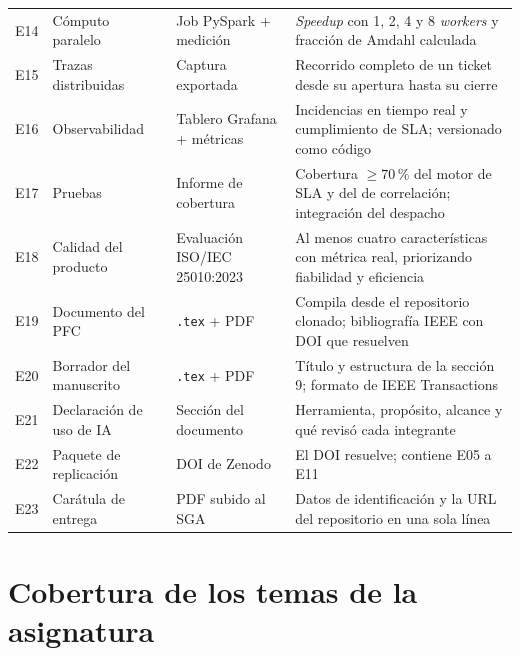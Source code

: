 \documentclass[11pt,a4paper]{article}
\begin{document}
\begin{center}
\begin{longtable}{@{}p{0.9cm}p{4.6cm}p{4.2cm}p{5.0cm}@{}}
		E14 & Cómputo paralelo & Job PySpark + medición & \emph{Speedup} con 1, 2, 4 y 8 \emph{workers} y fracción de Amdahl calculada \\
		E15 & Trazas distribuidas & Captura exportada & Recorrido completo de un ticket desde su apertura hasta su cierre \\
		E16 & Observabilidad & Tablero Grafana + métricas & Incidencias en tiempo real y cumplimiento de SLA; versionado como código \\
		E17 & Pruebas & Informe de cobertura & Cobertura $\geq 70\,\%$ del motor de SLA y del de correlación; integración del despacho \\
		E18 & Calidad del producto & Evaluación ISO/IEC 25010:2023 & Al menos cuatro características con métrica real, priorizando fiabilidad y eficiencia \cite{iso25010_2023} \\
		E19 & Documento del PFC & \texttt{.tex} + PDF & Compila desde el repositorio clonado; bibliografía IEEE con DOI que resuelven \\
		E20 & Borrador del manuscrito & \texttt{.tex} + PDF & Título y estructura de la sección 9; formato de IEEE Transactions \\
		E21 & Declaración de uso de IA & Sección del documento & Herramienta, propósito, alcance y qué revisó cada integrante \\
		E22 & Paquete de replicación & DOI de Zenodo & El DOI resuelve; contiene E05 a E11 \\
		E23 & Carátula de entrega & PDF subido al SGA & Datos de identificación y la URL del repositorio en una sola línea \\
		\bottomrule
	\end{longtable}
\end{center}

\section{Cobertura de los temas de la asignatura}
\end{document}
